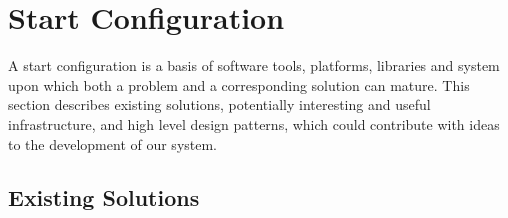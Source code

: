 
\section{Start Configuration}
\label{sec:start_configuration}

A start configuration is a basis of software tools, platforms, libraries and system upon which both a problem and a corresponding solution can mature. This section describes existing solutions, potentially interesting and useful infrastructure, and high level design patterns, which could contribute with ideas to the development of our system.

\subsection{Existing Solutions}
\label{sub:existing_solutions}

